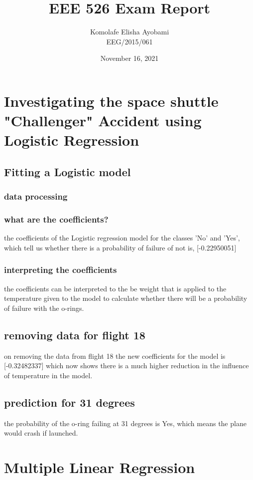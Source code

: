 \documentclass[a4paper,12pt]{report}
\title{\textbf{EEE 526 Exam Report}}
\author{Komolafe Elisha Ayobami\\ EEG/2015/061}
\date{November 16, 2021}
\begin{document}
{\Huge \maketitle}


\newpage
\chapter{Investigating the space shuttle "Challenger" Accident using Logistic Regression}

\section{Fitting a Logistic model}
\subsection{data processing}
\subsection{what are the coefficients?}
the coefficients of the Logistic regression model for the classes 'No' and 'Yes', which tell us whether there is a probability of failure of not is, [-0.22950051]
\subsection{interpreting the coefficients}
the coefficients can be interpreted to the be weight that is applied to the temperature given to the model to calculate whether there will be a probability of failure with the o-rings.

\section{removing data for flight 18}
on removing the data from flight 18 the new coefficients for the model is [-0.32482337] which now shows there is a much higher reduction in the influence of temperature in the model.
\section{prediction for 31 degrees}
the probability of the o-ring failing at 31 degrees is Yes, which means the plane would crash if launched.
\chapter{Multiple Linear Regression}
\end{document}
